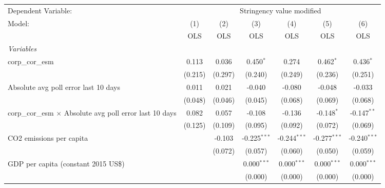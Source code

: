 
\begingroup
\centering
\begin{tabular}{lcccccc}
   \toprule
   Dependent Variable: & \multicolumn{6}{c}{Stringency value modified}\\
   Model:                                                          & (1)     & (2)     & (3)            & (4)            & (5)            & (6)\\  
                                                                   &  OLS    & OLS     & OLS            & OLS            & OLS            & OLS\\  
   \midrule
   \emph{Variables}\\
   corp\_cor\_esm                                                  & 0.113   & 0.036   & 0.450$^{*}$    & 0.274          & 0.462$^{*}$    & 0.436$^{*}$\\   
                                                                   & (0.215) & (0.297) & (0.240)        & (0.249)        & (0.236)        & (0.251)\\   
   Absolute avg poll error last 10 days                            & 0.011   & 0.021   & -0.040         & -0.080         & -0.048         & -0.033\\   
                                                                   & (0.048) & (0.046) & (0.045)        & (0.068)        & (0.069)        & (0.068)\\   
   corp\_cor\_esm $\times$ Absolute avg poll error last 10 days    & 0.082   & 0.057   & -0.108         & -0.136         & -0.148$^{*}$   & -0.147$^{**}$\\   
                                                                   & (0.125) & (0.109) & (0.095)        & (0.092)        & (0.072)        & (0.069)\\   
   CO2 emissions per capita                                        &         & -0.103  & -0.225$^{***}$ & -0.244$^{***}$ & -0.277$^{***}$ & -0.240$^{***}$\\   
                                                                   &         & (0.072) & (0.057)        & (0.060)        & (0.050)        & (0.059)\\   
   GDP per capita (constant 2015 US\$)                             &         &         & 0.000$^{***}$  & 0.000$^{***}$  & 0.000$^{***}$  & 0.000$^{***}$\\   
                                                                   &         &         & (0.000)        & (0.000)        & (0.000)        & (0.000)\\   

\end{tabular}
